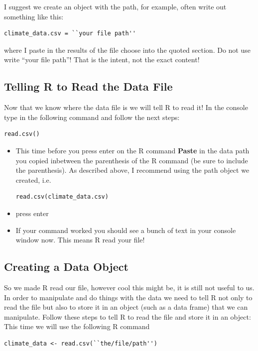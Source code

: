 \documentclass{article}\usepackage[]{graphicx}\usepackage[]{color}
\begin{document}
I suggest we create an object with the path, for example, often write out something like this:

\begin{verbatim}
climate_data.csv = ``your file path''
\end{verbatim}

\noindent where I paste in the results of the file choose into the quoted section. Do not use write ``your file path''! That is the intent, not the exact content!


\subsection{Telling R to Read the Data File}

Now that we know where the data file is we will tell R to read it! In the console type in the following command and follow the next steps: 
\begin{verbatim}
read.csv()
\end{verbatim}

\begin{itemize}
\item This time before you press enter on the R command \textbf{Paste} in the data path you copied inbetween the parenthesis of the R command (be sure to include the parenthesis). As described above, I recommend using the path object we created, i.e.

\begin{verbatim}
read.csv(climate_data.csv)
\end{verbatim}

\item press enter
\item If your command worked you should see a bunch of text in your console window now. This means R read your file!
\end{itemize}

\subsection{Creating a Data Object}
So we made R read our file, however cool this might be, it is still not useful to us. In order to manipulate and do things with the data we need to tell R not only to read the file but also to store it in an object (such as a data frame) that we can manipulate. Follow these steps to tell R to read the file and store it in an object: \\

This time we will use the following R command\\
\begin{verbatim}
climate_data <- read.csv(``the/file/path'')
\end{verbatim}
\end{document}
